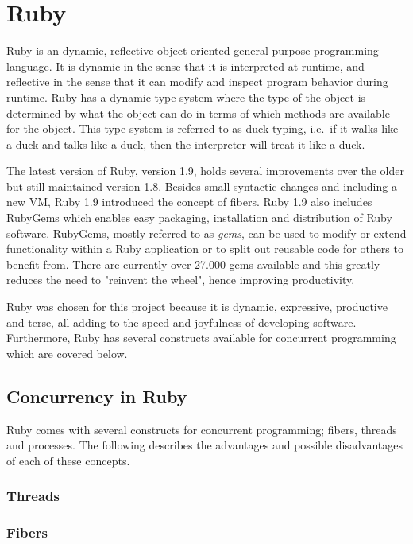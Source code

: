 \section{Ruby} %
\label{sec:ruby}

Ruby is an dynamic, reflective object-oriented general-purpose programming
language. It is dynamic in the sense that it is interpreted at runtime, and
reflective in the sense that it can modify and inspect program behavior during
runtime.  Ruby has a dynamic type system where the type of the object is
determined by what the object can do in terms of which methods are available
for the object. This type system is referred to as duck typing, i.e.\ if it
walks like a duck and talks like a duck, then the interpreter will treat it
like a duck.

The latest version of Ruby, version 1.9, holds several improvements over the
older but still maintained version 1.8. Besides small syntactic changes and
including a new VM, Ruby 1.9 introduced the concept of fibers. Ruby 1.9 also
includes RubyGems which enables easy packaging, installation and distribution of
Ruby software. RubyGems, mostly referred to as \textit{gems}, can be used to
modify or extend functionality within a Ruby application or to split out
reusable code for others to benefit from. There are currently over 27.000 gems
available and this greatly reduces the need to "reinvent the wheel", hence
improving productivity. 

Ruby was chosen for this project because it is dynamic, expressive, productive
and terse, all adding to the speed and joyfulness of developing software.
Furthermore, Ruby has several constructs available for concurrent programming
which are covered below.

\subsection{Concurrency in Ruby}
Ruby comes with several constructs for concurrent programming; fibers, threads
and processes. The following describes the advantages and possible disadvantages
of each of these concepts.

\subsubsection{Threads}


\subsubsection{Fibers}


